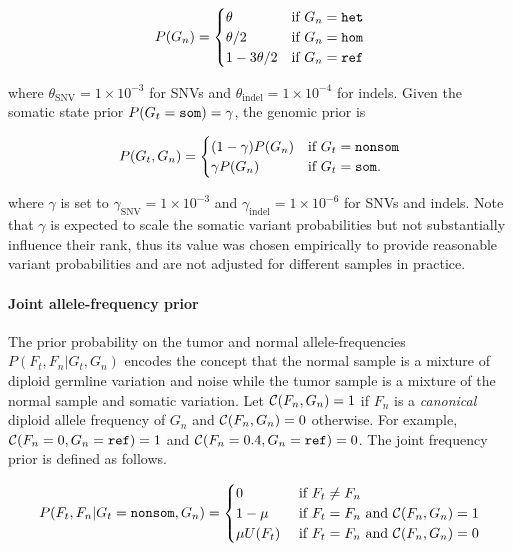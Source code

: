 \documentclass{article}
\begin{document}
\begin{equation*}
P(G_n)=
\begin{cases}
	\theta & \text{if } G_n = {\tt het} \\
	\theta/2 & \text{if } G_n = {\tt hom} \\
	1 - 3\theta/2 & \text{if } G_n = {\tt ref} \\
\end{cases}
\end{equation*}

\noindent where $\theta_{\text{SNV}}=1 \times 10^{-3}$ for SNVs and $\theta_{\text{indel}}=1 \times 10^{-4}$ for indels. Given the somatic state prior $P(G_t={\tt som}) = \gamma$, the genomic prior is

\begin{equation*}
P(G_t, G_n)=
\begin{cases}
	(1 - \gamma) P(G_n) & \text{if } G_t = {\tt nonsom} \\
	\gamma P(G_n) & \text{if } G_t = {\tt som}. \\
\end{cases}
\end{equation*}

\noindent where $\gamma$ is set to $\gamma_{\text{SNV}} = 1 \times 10^{-3}$ and $\gamma_{\text{indel}} = 1 \times 10^{-6}$ for SNVs and indels. Note that $\gamma$ is expected to scale the somatic variant probabilities but not substantially influence their rank, thus its value was chosen empirically to provide reasonable variant probabilities and are not adjusted for different samples in practice.


\paragraph{Joint allele-frequency prior}
The prior probability on the tumor and normal allele-frequencies $P(F_t, F_n|G_t, G_n)$ encodes the concept that the normal sample is a mixture of diploid germline variation and noise while the tumor sample is a mixture of the normal sample and somatic variation. Let ${\cal C} (F_n, G_n) = 1$ if $F_n$ is a {\em canonical} diploid allele frequency of $G_n$ and ${\cal C} (F_n, G_n) = 0$ otherwise. For example, ${\cal C} (F_n=0, G_n = {\tt ref}) = 1$ and ${\cal C} (F_n=0.4, G_n = {\tt ref}) = 0$. The joint frequency prior is defined as follows.

\begin{equation*}
P(F_t, F_n | G_t = {\tt nonsom}, G_n)=
\begin{cases}
	0 & \text{ if } F_t \neq F_n \\
	1-\mu & \text{ if } F_t = F_n \text{ and }{\cal C}(F_n, G_n) = 1 \\
	\mu U(F_t) & \text{ if } F_t = F_n \text{ and }{\cal C}(F_n, G_n) = 0 \\
\end{cases}
\end{equation*}
\end{document}
